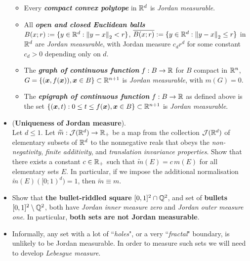 \documentclass[11pt]{article}
\begin{document}
\begin{itemize}
\begin{itemize}
\item Every \emph{\textbf{compact convex polytope}} in ${\mathbb R}^d$ is \emph{Jordan measurable}.

\item All \emph{\textbf{open and closed Euclidean balls}} $B(x; r) := \{y \in {\mathbb R}^d : \left\|y - x\right\|_{2} < r\}$, $\overline{B(x; r)} := \{y \in
{\mathbb R}^d: \left\|y - x\right\|_{2} \le r\}$ in ${\mathbb R}^d$ are \emph{Jordan measurable}, with Jordan measure $c_d r^d$ for some constant $c_d > 0$ depending only on $d$.

\item The \emph{\textbf{graph of continuous function}} $f: B\rightarrow {\mathbb R}$ for $B$ compact in ${\mathbb R}^{n}$, $G = \{(\boldsymbol{x}, f(\boldsymbol{x})), \boldsymbol{x}\in B\} \subset {\mathbb R}^{n+1}$ is \emph{Jordan measurable}, with $m(G) = 0$.

\item The \emph{\textbf{epigraph of continuous function}} $f: B\rightarrow {\mathbb R}$ as defined above is the set $\{ (\boldsymbol{x}, t): 0\le t\le f(\boldsymbol{x}), \boldsymbol{x}\in B \} \subset {\mathbb R}^{n+1}$ is  \emph{Jordan measurable}. 
\end{itemize}

\item \begin{exercise} (\textbf{Uniqueness of Jordan measure}). \citep{tao2011introduction}\\
Let $d \le 1$. Let $\widetilde{m} : \mathcal{J}({\mathbb R}^d) \rightarrow {\mathbb R}_{+}$ be a map from the collection $\mathcal{J}({\mathbb R}^d)$ of elementary subsets of ${\mathbb R}^d$ to the nonnegative reals that obeys the \emph{non-negativity}, \emph{finite additivity}, and \emph{translation invariance properties}. Show that
there exists a constant $c \in {\mathbb R}_{+}$ such that $\widetilde{m}(E) = c\,m(E)$ for all elementary sets $E$. In particular, if we impose the additional normalisation $\widetilde{m}(E)([0; 1)^d) = 1$, then $\widetilde{m} \equiv m$.
\end{exercise}

\item \begin{exercise}
Show that \textbf{the bullet-riddled square} $[0, 1]^2 \cap {\mathbb Q}^2$, and set of \textbf{bullets} $[0, 1]^2 \setminus {\mathbb Q}^2$, both have\emph{ Jordan inner measure zero}
and \emph{Jordan outer measure one}. In particular, \textbf{both sets are not Jordan measurable}.
\end{exercise}

\item \begin{remark}
Informally, any set with a lot of ``\emph{holes}", or a very ``\emph{fractal}" boundary, is unlikely to be Jordan measurable. In order to measure such sets we will need to develop \emph{Lebesgue measure}.
\end{remark}


\end{itemize}
\end{document}
